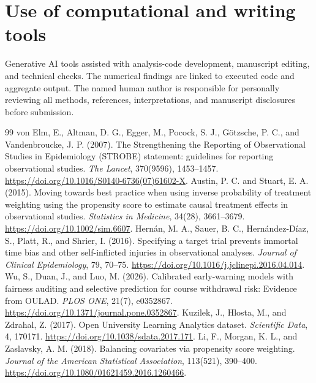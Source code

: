 \documentclass[10pt,a4paper]{article}
\begin{document}
\section*{Use of computational and writing tools}
Generative AI tools assisted with analysis-code development, manuscript editing, and technical checks. The numerical findings are linked to executed code and aggregate output. The named human author is responsible for personally reviewing all methods, references, interpretations, and manuscript disclosures before submission.

\begin{thebibliography}{99}
 von Elm, E., Altman, D. G., Egger, M., Pocock, S. J., G\"otzsche, P. C., and Vandenbroucke, J. P. (2007). The Strengthening the Reporting of Observational Studies in Epidemiology (STROBE) statement: guidelines for reporting observational studies. \emph{The Lancet}, 370(9596), 1453--1457. \url{https://doi.org/10.1016/S0140-6736(07)61602-X}.
 Austin, P. C. and Stuart, E. A. (2015). Moving towards best practice when using inverse probability of treatment weighting using the propensity score to estimate causal treatment effects in observational studies. \emph{Statistics in Medicine}, 34(28), 3661--3679. \url{https://doi.org/10.1002/sim.6607}.
 Hern\'an, M. A., Sauer, B. C., Hern\'andez-D\'iaz, S., Platt, R., and Shrier, I. (2016). Specifying a target trial prevents immortal time bias and other self-inflicted injuries in observational analyses. \emph{Journal of Clinical Epidemiology}, 79, 70--75. \url{https://doi.org/10.1016/j.jclinepi.2016.04.014}.
 Wu, S., Duan, J., and Luo, M. (2026). Calibrated early-warning models with fairness auditing and selective prediction for course withdrawal risk: Evidence from OULAD. \emph{PLOS ONE}, 21(7), e0352867. \url{https://doi.org/10.1371/journal.pone.0352867}.
 Kuzilek, J., Hlosta, M., and Zdrahal, Z. (2017). Open University Learning Analytics dataset. \emph{Scientific Data}, 4, 170171. \url{https://doi.org/10.1038/sdata.2017.171}.
 Li, F., Morgan, K. L., and Zaslavsky, A. M. (2018). Balancing covariates via propensity score weighting. \emph{Journal of the American Statistical Association}, 113(521), 390--400. \url{https://doi.org/10.1080/01621459.2016.1260466}.
\end{thebibliography}
\end{document}
